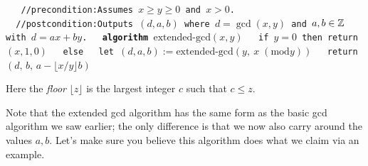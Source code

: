 \documentclass[11pt]{article}
\newcounter{thm}
\begin{document}
%
\par\smallskip
{\obeylines \tt
~~//precondition:\;\:Assumes $x\geq y\geq 0$ and $x>0$.
~~//postcondition:\;\:Outputs $(d,a,b)$ where $d=\gcd(x,y)$ and $a,b \in \mathbb{Z}$ with $d=ax+by$.
~~{\bf algorithm} $\text{extended-gcd}(x,y)$
~~\quad if $y = 0$ then return $(x, 1, 0)$
~~\quad else
~~\quad\quad let $(d, a, b) := \text{extended-gcd}(y, \: x \; (\text{mod} y))$
~~\quad\quad return $(d,\,b,\,a - \lfloor x/y\rfloor b)$
}
\par\smallskip\noindent
Here the {\em floor} $\lfloor z \rfloor$ is the largest integer $c$ such that $c \le z$.

Note that the extended gcd algorithm has the same form as the basic gcd algorithm we saw earlier; the only difference is that we now also carry around the values $a,b$. Let's make sure you believe this algorithm does what we claim via an example.
\end{document}
